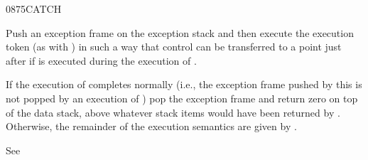 \begin{worddef}{0875}{CATCH}
\item {}

	Push an exception frame on the exception stack and then execute
	the execution token  (as with ) in
	such a way that control can be transferred to a point just after
	 if  is executed during the execution of
	.

	If the execution of  completes normally (i.e., the
	exception frame pushed by this  is not popped by an
	execution of ) pop the exception frame and return
	zero on top of the data stack, above whatever stack items would
	have been returned by  . Otherwise,
	the remainder of the execution semantics are given by
	.

\see {}

	\begin{testing}
		See 
	\end{testing}
\end{worddef}


